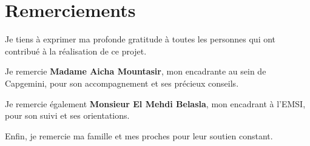 \chapter*{Remerciements}

Je tiens à exprimer ma profonde gratitude à toutes les personnes qui ont contribué à la réalisation de ce projet.

Je remercie \textbf{Madame Aicha Mountasir}, mon encadrante au sein de Capgemini, pour son accompagnement et ses précieux conseils.

Je remercie également \textbf{Monsieur El Mehdi Belasla}, mon encadrant à l'EMSI, pour son suivi et ses orientations.

Enfin, je remercie ma famille et mes proches pour leur soutien constant.

\newpage
